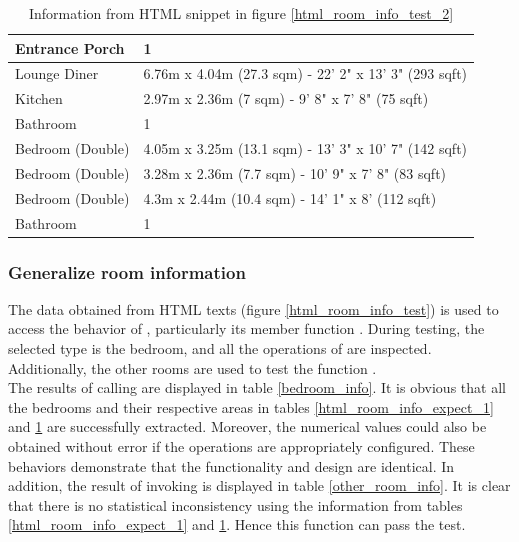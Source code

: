 \documentclass[12pt,twoside]{report}
\begin{document}
\begin{table}[!htbp]
	\centering
	\caption{Information from HTML snippet in figure \ref*{html_room_info_test_2}}
	\begin{tabular} {| l | l |}
		\hline
		Entrance Porch & 1\\
		\hline
		Lounge Diner & 6.76m x 4.04m (27.3 sqm) - 22' 2" x 13' 3" (293 sqft)\\
		\hline
		Kitchen & 2.97m x 2.36m (7 sqm) - 9' 8" x 7' 8" (75 sqft)\\
		\hline
		Bathroom & 1\\
		\hline
		Bedroom (Double) & 4.05m x 3.25m (13.1 sqm) - 13' 3" x 10' 7" (142 sqft)\\
		\hline 
		Bedroom (Double) & 3.28m x 2.36m (7.7 sqm) - 10' 9" x 7' 8" (83 sqft)\\
		\hline
		Bedroom (Double) & 4.3m x 2.44m (10.4 sqm) - 14' 1" x 8' (112 sqft)\\
		\hline
		Bathroom & 1\\
		\hline
	\end{tabular}
	\label{html_room_info_expect_2}
\end{table}

\subsubsection{Generalize room information}
The data obtained from HTML texts (figure \ref{html_room_info_test}) is used to access the behavior of , particularly its member function . During testing, the selected type is the bedroom, and all the operations of  are inspected. Additionally, the other rooms are used to test the function . 
\\

The results of calling  are displayed in table \ref{bedroom_info}. It is obvious that all the bedrooms and their respective areas in tables \ref{html_room_info_expect_1} and \ref{html_room_info_expect_2} are successfully extracted. Moreover, the numerical values could also be obtained without error if the operations are appropriately configured. These behaviors demonstrate that the functionality and design are identical. In addition, the result of invoking  is displayed in table \ref{other_room_info}. It is clear that there is no statistical inconsistency using the information from tables \ref{html_room_info_expect_1} and \ref{html_room_info_expect_2}. Hence this function can pass the test. 
\end{document}
